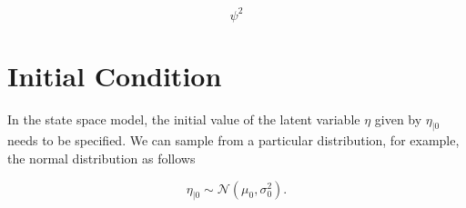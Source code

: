 \documentclass{article}
\begin{document}
\begin{equation}
    \psi^{2}
\end{equation}

\section{Initial Condition}

In the state space model, the initial value of the latent variable $\eta$ given by $\eta_{\mid 0}$ needs to be specified. We can sample from a particular distribution, for example, the normal distribution as follows

\begin{equation}
    \eta_{\mid 0} \sim \mathcal{N} \left( \mu_{0}, \sigma^{2}_{0} \right) .
\end{equation}
\end{document}
